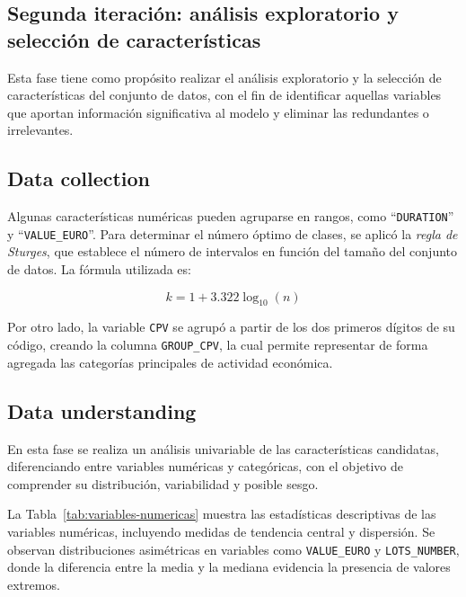 \documentclass[a4paper,fleqn]{cas-sc}
\begin{document}
\subsection{Segunda iteración: análisis exploratorio y selección de características}

Esta fase tiene como propósito realizar el análisis exploratorio y la selección de características del conjunto de datos, con el fin de identificar aquellas variables que aportan información significativa al modelo y eliminar las redundantes o irrelevantes. 


\subsection*{Data collection}

Algunas características numéricas pueden agruparse en rangos, como ``\texttt{DURATION}'' y \linebreak``\texttt{VALUE\_EURO}''. Para determinar el número óptimo de clases, se aplicó la \textit{regla de Sturges}, que establece el número de intervalos en función del tamaño del conjunto de datos. La fórmula utilizada es:

\begin{equation}
	k = 1 + 3.322 \log_{10}(n)
\end{equation}

Por otro lado, la variable \texttt{CPV} se agrupó a partir de los dos primeros dígitos de su código, creando la columna \texttt{GROUP\_CPV}, la cual permite representar de forma agregada las categorías principales de actividad económica.


\subsection*{Data understanding}

En esta fase se realiza un análisis univariable de las características candidatas, diferenciando entre variables numéricas y categóricas, con el objetivo de comprender su distribución, variabilidad y posible sesgo.

La Tabla~\ref{tab:variables-numericas} muestra las estadísticas descriptivas de las variables numéricas, incluyendo medidas de tendencia central y dispersión. 
Se observan distribuciones asimétricas en variables como \texttt{VALUE\_EURO} y \texttt{LOTS\_NUMBER}, donde la diferencia entre la media y la mediana evidencia la presencia de valores extremos.
\end{document}
